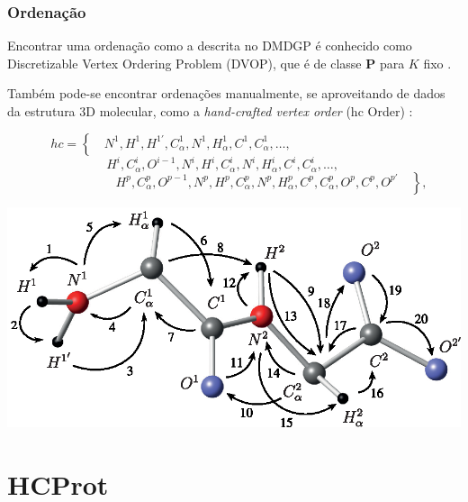 \documentclass[10pt]{beamer}
\theoremstyle{plain}
\theoremstyle{definition}
\begin{document}
	\begin{frame}
		\frametitle{\normalsize Ordenação} 
		{
			\small
			Encontrar uma ordenação como a descrita no DMDGP é conhecido como Discretizable Vertex Ordering Problem (DVOP), que é de classe \textbf{P} para $K$ fixo \cite{douglasDVOP}. 
			\vspace{0.5cm}
			
			Também pode-se encontrar ordenações manualmente, se aproveitando de dados da estrutura 3D molecular, como a \textit{hand-crafted vertex order} (hc Order) \cite{carlile:MinimalOrder}:
			
			\begin{equation*}
				hc = \left\{ \quad N^1, H^1, H^{1'}, C_{\alpha}^1, N^1, H_{\alpha}^1, C^1, C_{\alpha}^1, \dots, \qquad \qquad \qquad \qquad \qquad \right.
			\end{equation*}%
			\begin{equation*}
				\qquad \qquad \ H^i, C_{\alpha}^i, O^{i-1}, N^i, H^i, C^{i}_\alpha, N^i, H^{i}_\alpha, C^i, C_{\alpha}^i,\dots, \qquad \qquad \qquad
			\end{equation*}%
			\begin{equation*}
				\left. \qquad \qquad \qquad H^p, C_{\alpha}^p, O^{p-1}, N^p, H^p, C^{p}_\alpha, N^p, H^{p}_\alpha, C^p, C_{\alpha}^p, O^p, C^p, O^{p'} \quad \right\},
			\end{equation*}
			
			\vspace{-2.2cm}
			\begin{center}
				\includegraphics[width=0.65\linewidth]{proteinOrdened.eps}	
			\end{center}
		}	
	\end{frame}
	
	\section{HCProt}
	
\end{document}
